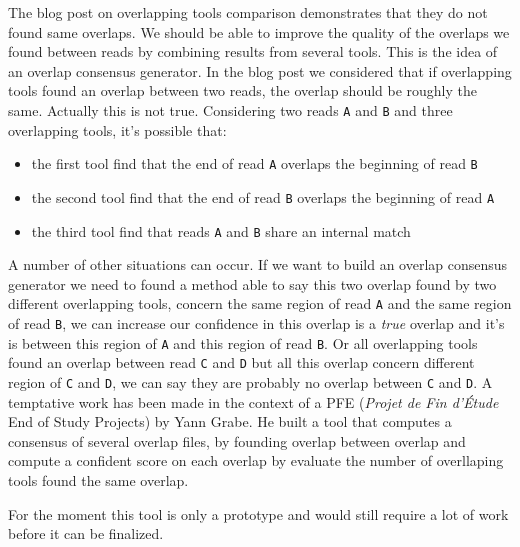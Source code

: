 \documentclass[main.tex]{subfiles}
\begin{document}
The blog post on overlapping tools comparison demonstrates that they do not found same overlaps. We should be able to improve the quality of the overlaps we found between reads by combining results from several tools. This is the idea of an overlap consensus generator. In the blog post we considered that if overlapping tools found an overlap between two reads, the overlap should be roughly the same. Actually this is not true. Considering two reads \texttt{A} and \texttt{B} and three overlapping tools, it's possible that:
\begin{itemize}
    \item the first tool find that the end of read \texttt{A} overlaps the beginning of read \texttt{B}
    \item the second tool find that the end of read \texttt{B} overlaps the beginning of read \texttt{A}
    \item the third tool find that reads \texttt{A} and \texttt{B} share an internal match
\end{itemize}
A number of other situations can occur. If we want to build an overlap consensus generator we need to found a method able to say this two overlap found by two different overlapping tools, concern the same region of read \texttt{A} and the same region of read \texttt{B}, we can increase our confidence in this overlap is a \textit{true} overlap and it's is between this region of \texttt{A} and this region of read \texttt{B}. Or all overlapping tools found an overlap between read \texttt{C} and \texttt{D} but all this overlap concern different region of \texttt{C} and \texttt{D}, we can say they are probably no overlap between \texttt{C} and \texttt{D}.
A temptative work has been  made in the context of a PFE (\textit{Projet de Fin d'Étude} End of Study Projects) by Yann Grabe. He built a tool that computes a consensus of several overlap files, by founding overlap between overlap and compute a confident score on each overlap by evaluate the number of overllaping tools found the same overlap.

For the moment this tool is only a prototype and would still require a lot of work before it can be finalized. 

%
%
\end{document}
